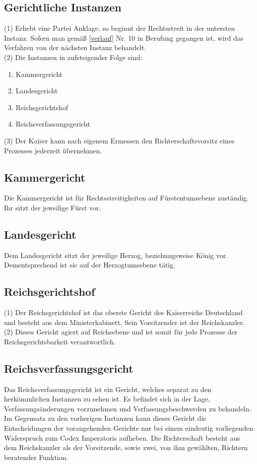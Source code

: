 \documentclass{article}
\begin{document}
\subsection{Gerichtliche Instanzen}
(1) Erhebt eine Partei Anklage, so beginnt der Rechtsstreit in der untersten Instanz. Sofern man gemäß \ref{verlauf} Nr. 10 in Berufung gegangen ist, wird das Verfahren von der nächsten Instanz behandelt.\\
(2) Die Instanzen in aufsteigender Folge sind:
\begin{enumerate}
	\item Kammergericht
	\item Landesgericht
	\item Reichsgerichtshof
	\item Reichsverfassungsgericht
\end{enumerate}
(3) Der Kaiser kann nach eigenem Ermessen den Richterschaftsvorsitz eines Prozesses jederzeit übernehmen.

\subsection{Kammergericht}
Die Kammergericht ist für Rechtsstreitigkeiten auf Fürstentumsebene zuständig. Ihr sitzt der jeweilige Fürst vor.

\subsection{Landesgericht}
Dem Landesgericht sitzt der jeweilige Herzog, beziehungsweise König vor. Dementsprechend ist sie auf der Herzogtumsebene tätig.

\subsection{Reichsgerichtshof}
(1) Der Reichsgerichtshof ist das oberste Gericht des Kaiserreichs Deutschland und besteht aus dem Ministerkabinett. Sein Vorsitzender ist der Reichskanzler.\\
(2) Dieses Gericht agiert auf Reichsebene und ist somit für jede Prozesse der Reichsgerichtsbarkeit verantwortlich.

\subsection{Reichsverfassungsgericht}
Das Reichsverfassungsgericht ist ein Gericht, welches separat zu den herkömmlichen Instanzen zu sehen ist. Es befindet sich in der Lage, Verfassungsänderungen vorzunehmen und Verfassungsbeschwerden zu behandeln. Im Gegensatz zu den vorherigen Instanzen kann dieses Gericht die Entscheidungen der vorangehenden Gerichte nur bei einem eindeutig vorliegenden Widerspruch zum Codex Imperatoris aufheben. Die Richterschaft besteht aus dem Reichskanzler als der Vorsitzende, sowie zwei, von ihm gewählten, Richtern beratender Funktion.
\end{document}

